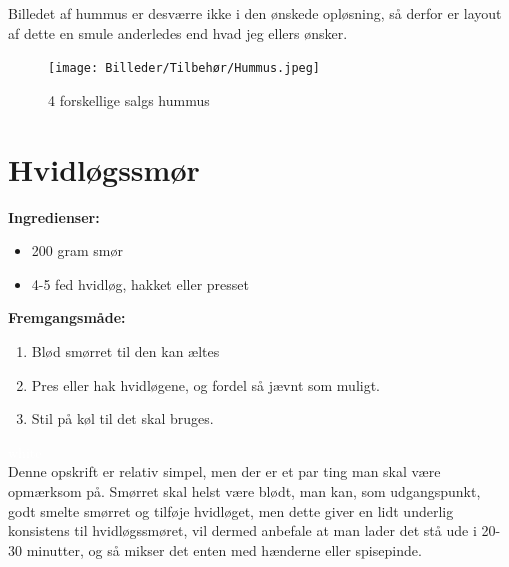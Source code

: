 \documentclass{book}
\begin{document}
Billedet af hummus er desværre ikke i den ønskede opløsning, så derfor er layout af dette en smule anderledes end hvad jeg ellers ønsker.
\begin{figure}[h]
    \centering
    \texttt{[image: Billeder/Tilbehør/Hummus.jpeg]}
    \caption{4 forskellige salgs hummus}
    \label{fig:enter-label}
\end{figure}
\newpage \section{Hvidløgssmør}
\begin{minipage}[t]{0.5\textwidth}
\textbf{Ingredienser:}
\begin{itemize}
    \item 200 gram smør
    \item 4-5 fed hvidløg, hakket eller presset
\end{itemize}
\end{minipage}
\begin{minipage}[t]{0.5\textwidth}
\textbf{Fremgangsmåde:}
\begin{enumerate}
    \item Blød smørret til den kan æltes
    \item Pres eller hak hvidløgene, og fordel så jævnt som muligt.
    \item Stil på køl til det skal bruges.
\end{enumerate}
\end{minipage}
\textcolor{white}{white} \\
Denne opskrift er relativ simpel, men der er et par ting man skal være opmærksom på. Smørret skal helst være blødt, man kan, som udgangspunkt, godt smelte smørret og tilføje hvidløget, men dette giver en lidt underlig konsistens til hvidløgssmøret, vil dermed anbefale at man lader det stå ude i 20-30 minutter, og så mikser det enten med hænderne eller spisepinde. 
\end{document}
